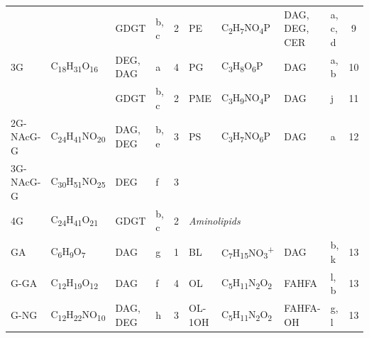 \begin{landscape}
\begin{table}
\begin{adjustbox}{width=\textheight,keepaspectratio}
\begin{threeparttable}
\begin{tabular}{lrllcrrrrr}
      &       & GDGT  & b, c  & 2     & \multicolumn{1}{l}{PE} & \multicolumn{1}{l}{C\textsubscript{2}H\textsubscript{7}NO\textsubscript{4}P} & \multicolumn{1}{l}{DAG, DEG, CER} & \multicolumn{1}{l}{a, c, d} & \multicolumn{1}{c}{9} \\
3G    & \multicolumn{1}{l}{C\textsubscript{18}H\textsubscript{31}O\textsubscript{16}} & DEG, DAG & a     & 4     & \multicolumn{1}{l}{PG} & \multicolumn{1}{l}{C\textsubscript{3}H\textsubscript{8}O\textsubscript{6}P} & \multicolumn{1}{l}{DAG} & \multicolumn{1}{l}{a, b} & \multicolumn{1}{c}{10} \\
      &       & GDGT  & b, c  & 2     & \multicolumn{1}{l}{PME} & \multicolumn{1}{l}{C\textsubscript{3}H\textsubscript{9}NO\textsubscript{4}P} & \multicolumn{1}{l}{DAG} & \multicolumn{1}{l}{j} & \multicolumn{1}{c}{11} \\
2G-NAcG-G & \multicolumn{1}{l}{C\textsubscript{24}H\textsubscript{41}NO\textsubscript{20}} & DAG, DEG & b, e  & 3     & \multicolumn{1}{l}{PS} & \multicolumn{1}{l}{C\textsubscript{3}H\textsubscript{7}NO\textsubscript{6}P} & \multicolumn{1}{l}{DAG} & \multicolumn{1}{l}{a} & \multicolumn{1}{c}{12} \\
3G-NAcG-G & \multicolumn{1}{l}{C\textsubscript{30}H\textsubscript{51}NO\textsubscript{25}} & DEG   & f     & 3     &       &       &       &       &  \\
4G    & \multicolumn{1}{l}{C\textsubscript{24}H\textsubscript{41}O\textsubscript{21}} & GDGT  & b, c  & 2     & \multicolumn{2}{l}{\textit{Aminolipids}} &       &       &  \\
GA    & \multicolumn{1}{l}{C\textsubscript{6}H\textsubscript{9}O\textsubscript{7}} & DAG   & g     & 1     & \multicolumn{1}{l}{BL} & \multicolumn{1}{l}{C\textsubscript{7}H\textsubscript{15}NO\textsubscript{3}\textsuperscript{+}} & \multicolumn{1}{l}{DAG} & \multicolumn{1}{l}{b, k\newline{}} & \multicolumn{1}{c}{13} \\
G-GA  & \multicolumn{1}{l}{C\textsubscript{12}H\textsubscript{19}O\textsubscript{12}} & DAG   & f     & 4     & \multicolumn{1}{l}{OL} & \multicolumn{1}{l}{C\textsubscript{5}H\textsubscript{11}N\textsubscript{2}O\textsubscript{2}} & \multicolumn{1}{l}{FAHFA} & \multicolumn{1}{l}{l, b} & \multicolumn{1}{c}{13} \\
G-NG  & \multicolumn{1}{l}{C\textsubscript{12}H\textsubscript{22}NO\textsubscript{10}} & DAG, DEG & h     & 3     & \multicolumn{1}{l}{OL-1OH} & \multicolumn{1}{l}{C\textsubscript{5}H\textsubscript{11}N\textsubscript{2}O\textsubscript{2}} & \multicolumn{1}{l}{FAHFA-OH} & \multicolumn{1}{l}{g, l} & \multicolumn{1}{c}{13} \\

\end{tabular}
\end{threeparttable}
\end{adjustbox}
\end{table}
\end{landscape}
